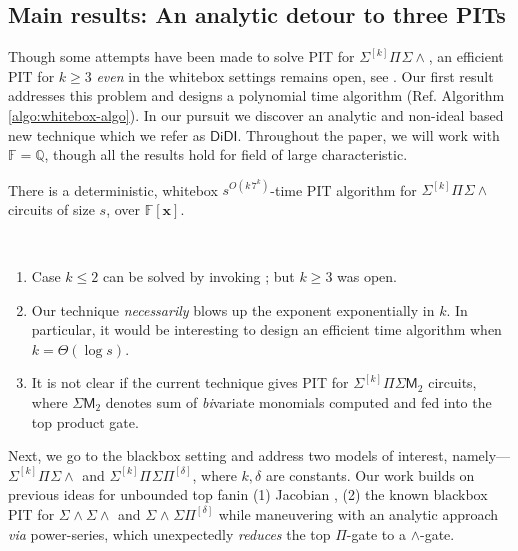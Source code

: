 \documentclass[10pt,a4paper]{article}
\newcommand{\F}{\mathbb{F}}
\newcommand{\Q}{\mathbb{Q}}
\newcommand{\x}{{\boldsymbol x}}
\newcommand{\SPSP}[3]{\Sigma^{#1}\Pi^{#2}\Sigma\Pi^{#3}}
\newcommand{\SWSP}[3]{\Sigma^{#1}\!\wedge^{#2}\!\Sigma\Pi^{#3}}
\newcommand{\SPSU}[3]{\Sigma^{#1} \Pi^{#2} \Sigma \wedge^{#3}}
\newcommand{\SWSU}[2]{\Sigma^{#1}\!\wedge\!\Sigma\!\wedge^{#2}}
\numberwithin{equation}{section}
\begin{document}
\vspace*{1em}
\subsection{Main results: An analytic detour to three PITs}
Though some attempts have been made to solve PIT for $\SPSU{[k]}{}{}$, an efficient PIT for $k \ge 3$  \emph{even} in the whitebox settings remains open, see \cite[Open Prob.~2]{saha2013case}. Our first result addresses this problem and designs a polynomial time algorithm (Ref. Algorithm \ref{algo:whitebox-algo}). In our pursuit we discover an analytic and non-ideal based new technique which we refer as $\mathsf{DiDI}$. Throughout the paper, we will work with $\F=\Q$, though all the results hold for field of large characteristic. 

\begin{theorem}[Whitebox $\SPSU{[k]}{}{}$ PIT] \label{thm:thm1}
There is a deterministic, whitebox $s^{O(k\,7^k)}$-time PIT algorithm for $\SPSU{[k]}{}{}$ circuits of size $s$, over $\F[\x]$.
\end{theorem}

\begin{remark*} ~ 
    \begin{enumerate}
        \item Case $k \le 2$ can be solved by invoking \cite[Theorem 5.2]{saha2013case}; but $k \ge3$ was open.
        \item Our technique \emph{necessarily} blows up the exponent exponentially in $k$. In particular, it would be interesting to design an efficient time algorithm when $k=\Theta(\log s)$.
        \item It is not clear if the current technique gives PIT for $\Sigma^{[k]}\Pi\Sigma\mathsf{M}_2$ circuits, where \(\Sigma\mathsf{M}_2\) denotes sum of {\em bi}variate monomials computed and fed into the top product gate.
%
    \end{enumerate}
\end{remark*}

Next, we go to the blackbox setting and address two models of interest, namely--- $\SPSU{[k]}{}{}$ and $\SPSP{[k]}{}{[\delta]}$, where $k, \delta$ are constants. Our work builds on previous ideas for unbounded top fanin (1) Jacobian \cite{agrawal2016jacobian}, (2) the known blackbox PIT for $\SWSU{}{}{}$ and $\SWSP{}{}{[\delta]}$ \cite{gurjarARO,forbes2015deterministic} while maneuvering with an analytic approach \emph{via} power-series, which unexpectedly \emph{reduces} the top $\Pi$-gate to a $\wedge$-gate.
\end{document}
